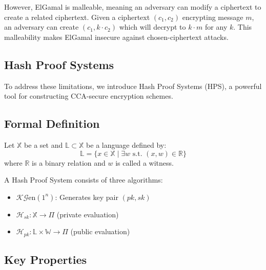 However, ElGamal is malleable, meaning an adversary can modify a ciphertext to create a related ciphertext. Given a ciphertext $(c_1, c_2)$ encrypting message $m$, an adversary can create $(c_1, k \cdot c_2)$ which will decrypt to $k \cdot m$ for any $k$. This malleability makes ElGamal insecure against chosen-ciphertext attacks.

\subsection{Hash Proof Systems}

To address these limitations, we introduce Hash Proof Systems (HPS), a powerful tool for constructing CCA-secure encryption schemes.

\subsection{Formal Definition}

Let $\mathbb{X}$ be a set and $\mathbb{L} \subset \mathbb{X}$ be a language defined by:
\[ \mathbb{L} = \{x \in \mathbb{X} \mid \exists w \text{ s.t. } (x,w) \in \mathbb{R}\} \]
where $\mathbb{R}$ is a binary relation and $w$ is called a witness.

A Hash Proof System consists of three algorithms:
\begin{itemize}
    \item $\mathcal{K}\mathcal{G}\text{en}(1^n)$: Generates key pair $(pk, sk)$
    \item $\mathcal{H}_{sk}: \mathbb{X} \rightarrow \Pi$ (private evaluation)
    \item $\mathcal{H}_{pk}: \mathbb{L} \times \mathbb{W} \rightarrow \Pi$ (public evaluation)
\end{itemize}

\subsection{Key Properties}

